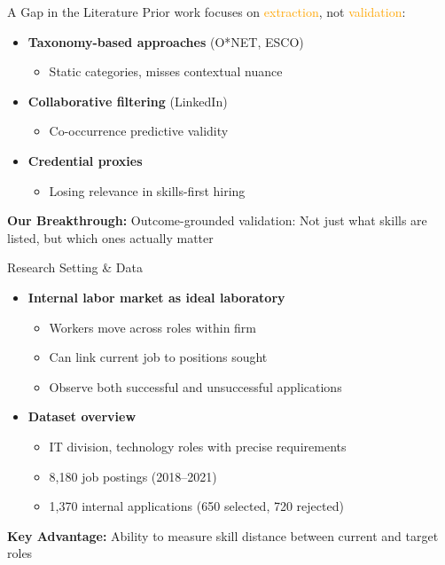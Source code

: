 \documentclass{beamer}
\begin{document}
\begin{frame}{A Gap in the Literature}
Prior work focuses on \textcolor{orange}{extraction}, not \textcolor{orange}{validation}:
\begin{itemize}
    \item \textbf{Taxonomy-based approaches} (O*NET, ESCO)
    \begin{itemize}
        \item Static categories, misses contextual nuance
    \end{itemize}
    \item \textbf{Collaborative filtering} (LinkedIn)
    \begin{itemize}
        \item Co-occurrence predictive validity
    \end{itemize}
    \item \textbf{Credential proxies}
    \begin{itemize}
        \item Losing relevance in skills-first hiring
    \end{itemize}
\end{itemize}

\begin{tcolorbox}[colback=boxbackground,colframe=boxframe,sharp corners]
\textbf{Our Breakthrough:} Outcome-grounded validation: Not just what skills are listed, but which ones actually matter
\end{tcolorbox}
\end{frame}

\begin{frame}{Research Setting \& Data}
\begin{itemize}
    \item \textbf{Internal labor market as ideal laboratory}
    \begin{itemize}
        \item Workers move across roles within firm
        \item Can link current job to positions sought
        \item Observe both successful and unsuccessful applications
    \end{itemize}
    \item \textbf{Dataset overview}
    \begin{itemize}
        \item IT division, technology roles with precise requirements
        \item 8,180 job postings (2018--2021)
        \item 1,370 internal applications (650 selected, 720 rejected)
    \end{itemize}
\end{itemize}

\begin{tcolorbox}[colback=boxbackground,colframe=boxframe,sharp corners]
\textbf{Key Advantage:} Ability to measure skill distance between current and target roles
\end{tcolorbox}
\end{frame}
\end{document}
